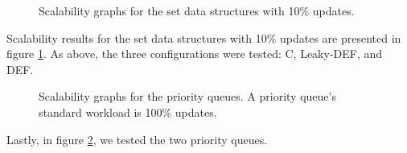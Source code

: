 \begin{figure}[tbp]
  \caption{Scalability graphs for the set data structures with 10\% updates.}
  \label{fig:workload1}
\end{figure}

Scalability results for the set data structures with 10\% updates are presented in figure \ref{fig:workload1}.  As above, the three configurations were tested: C, Leaky-DEF, and DEF.

\begin{figure}[tbp]
  \centering
  \caption{Scalability graphs for the priority queues.  A priority queue's standard workload is 100\% updates.}
  \label{fig:priorityqueues}
\end{figure}

Lastly, in figure \ref{fig:priorityqueues}, we tested the two priority queues.

